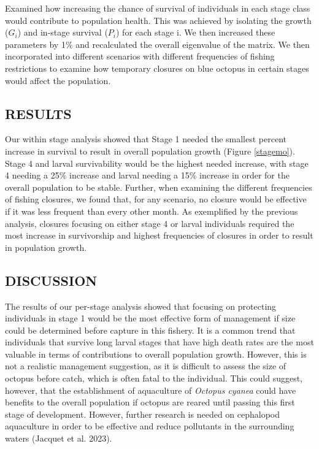 \documentclass[
]{article}
\begin{document}
Examined how increasing the chance of survival of individuals in each stage class would contribute to population health. This was achieved by isolating the growth (\(G_i\)) and in-stage survival (\(P_i\)) for each stage i. We then increased these parameters by 1\% and recalculated the overall eigenvalue of the matrix. We then incorporated into different scenarios with different frequencies of fishing restrictions to examine how temporary closures on blue octopus in certain stages would affect the population.

\hypertarget{results}{%
\subsection{RESULTS}\label{results}}

Our within stage analysis showed that Stage 1 needed the smallest percent increase in survival to result in overall population growth (Figure \ref{stagemo}). Stage 4 and larval survivability would be the highest needed increase, with stage 4 needing a 25\% increase and larval needing a 15\% increase in order for the overall population to be stable. Further, when examining the different frequencies of fishing closures, we found that, for any scenario, no closure would be effective if it was less frequent than every other month. As exemplified by the previous analysis, closures focusing on either stage 4 or larval individuals required the most increase in survivorship and highest frequencies of closures in order to result in population growth.

\hypertarget{discussion}{%
\subsection{DISCUSSION}\label{discussion}}

The results of our per-stage analysis showed that focusing on protecting individuals in stage 1 would be the most effective form of management if size could be determined before capture in this fishery. It is a common trend that individuals that survive long larval stages that have high death rates are the most valuable in terms of contributions to overall population growth. However, this is not a realistic management suggestion, as it is difficult to assess the size of octopus before catch, which is often fatal to the individual. This could suggest, however, that the establishment of aquaculture of \emph{Octopus cyanea} could have benefits to the overall population if octopus are reared until passing this first stage of development. However, further research is needed on cephalopod aquaculture in order to be effective and reduce pollutants in the surrounding waters (Jacquet et al. 2023).
\end{document}
